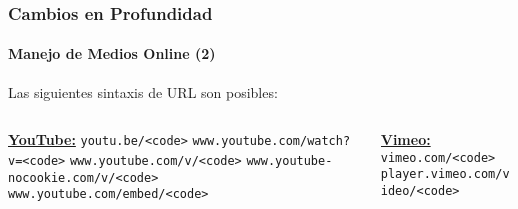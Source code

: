 \begin{frame}[fragile]
	\frametitle{Cambios en Profundidad}
	\framesubtitle{Manejo de Medios Online (2)}

	Las siguientes sintaxis de URL son posibles:
	\vspace{0.4cm}

	\begin{columns}[T]
		\begin{column}{.52\textwidth}
			\smaller
				\tabto{0.2cm}\textbf{\underline{YouTube:}}\newline
				\tabto{0.2cm}\texttt{youtu.be/<code>}\newline
				\tabto{0.2cm}\texttt{www.youtube.com/watch?v=<code>}\newline
				\tabto{0.2cm}\texttt{www.youtube.com/v/<code>}\newline
				\tabto{0.2cm}\texttt{www.youtube-nocookie.com/v/<code>}\newline
				\tabto{0.2cm}\texttt{www.youtube.com/embed/<code>}\newline
		\end{column}
		\begin{column}{.48\textwidth}
			\vspace{-0.25cm}\smaller
				\textbf{\underline{Vimeo:}}\newline
				\texttt{vimeo.com/<code>}\newline
				\texttt{player.vimeo.com/video/<code>}\newline
		\end{column}
	\end{columns}

\end{frame}



